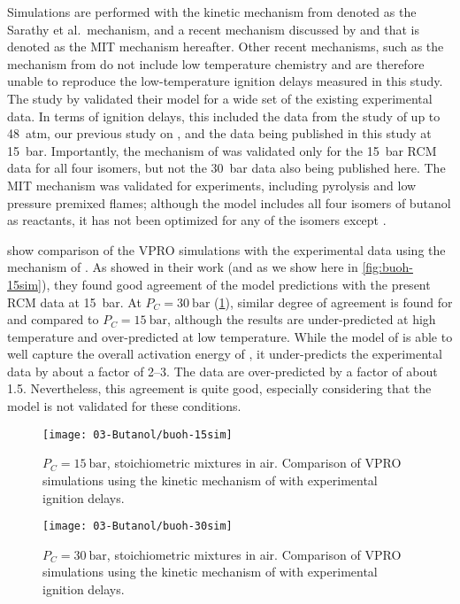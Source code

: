 \documentclass[../main.tex]{subfiles}
\begin{document}
Simulations are performed with the kinetic mechanism from
\textcite{Sarathy2012} denoted as the Sarathy et al.\ mechanism, and a
recent mechanism discussed by \textcite{Hansen2013} and
\textcite{Merchant2013} that is denoted as the MIT mechanism hereafter.
Other recent mechanisms, such as the mechanism from
\textcite{Frassoldati2012} do not include low temperature chemistry and are
therefore unable to reproduce the low-temperature ignition delays measured in
this study. The study by \textcite{Sarathy2012} validated their model for a
wide set of the existing experimental data. In terms of ignition delays, this
included the data from the study of \textcite{Stranic2012} up to \SI{48}{atm}, our
previous study on \nBuOH{} \cite{Weber2011}, and the data being
published in this study at \SI{15}{\bar}. Importantly, the mechanism of
\textcite{Sarathy2012} was validated only for the \SI{15}{\bar} RCM data for all four
isomers, but not the \SI{30}{\bar} data also being published here. The MIT mechanism
\cite{Hansen2013,Merchant2013} was validated for \iBuOH{}
experiments, including pyrolysis and low pressure premixed flames; although the
model includes all four isomers of butanol as reactants, it has not been
optimized for any of the isomers except \iBuOH{}.

 show comparison of the
VPRO simulations with the experimental data using the mechanism of
\textcite{Sarathy2012}. As \textcite{Sarathy2012} showed in their work (and as
we show here in \cref{fig:buoh-15sim}), they found good agreement of the
model predictions with the present RCM data at \SI{15}{\bar}. At $P_C=\SI{30}{\bar}$
(\cref{fig:buoh-30sim}), similar degree of agreement is found for
\tBuOH{} and \sBuOH{} compared to $P_C=\SI{15}{\bar}$, although
the \sBuOH{} results are under-predicted at high temperature and
over-predicted at low temperature. While the model of \textcite{Sarathy2012} is
able to well capture the overall activation energy of \iBuOH{}, it
under-predicts the experimental data by about a factor of \numrange{2}{3}. The
\nBuOH{} data are over-predicted by a factor of about 1.5.
Nevertheless, this agreement is quite good, especially considering that the
model is not validated for these conditions.

\begin{figure}
    \begin{floatrow}
    \ffigbox
        {\texttt{[image: 03-Butanol/buoh-15sim]}}
        {\caption{$P_C=\SI{15}{\bar}$, stoichiometric mixtures in air. Comparison of
            VPRO simulations using the kinetic mechanism of
            \textcite{Sarathy2012} with experimental ignition delays.}
        \label{fig:buoh-15sim}}
    \ffigbox
        {\texttt{[image: 03-Butanol/buoh-30sim]}}
        {\caption{$P_C=\SI{30}{\bar}$, stoichiometric mixtures in air. Comparison of
            VPRO simulations using the kinetic mechanism of
            \textcite{Sarathy2012} with experimental ignition delays.}
        \label{fig:buoh-30sim}}
    \end{floatrow}
\end{figure}
\end{document}
